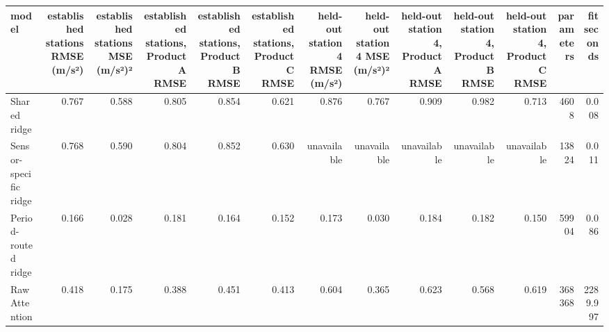 \begin{tabular}{lrrrrrrrrrrrr}
\toprule
model & established stations RMSE (m/s²) & established stations MSE (m/s²)² & established stations, Product A RMSE & established stations, Product B RMSE & established stations, Product C RMSE & held-out station 4 RMSE (m/s²) & held-out station 4 MSE (m/s²)² & held-out station 4, Product A RMSE & held-out station 4, Product B RMSE & held-out station 4, Product C RMSE & parameters & fit seconds \\
\midrule
Shared ridge & 0.767 & 0.588 & 0.805 & 0.854 & 0.621 & 0.876 & 0.767 & 0.909 & 0.982 & 0.713 & 4608 & 0.008 \\
Sensor-specific ridge & 0.768 & 0.590 & 0.804 & 0.852 & 0.630 & unavailable & unavailable & unavailable & unavailable & unavailable & 13824 & 0.011 \\
Period-routed ridge & 0.166 & 0.028 & 0.181 & 0.164 & 0.152 & 0.173 & 0.030 & 0.184 & 0.182 & 0.150 & 59904 & 0.086 \\
Raw Attention & 0.418 & 0.175 & 0.388 & 0.451 & 0.413 & 0.604 & 0.365 & 0.623 & 0.568 & 0.619 & 368368 & 2289.997 \\
\bottomrule
\end{tabular}
